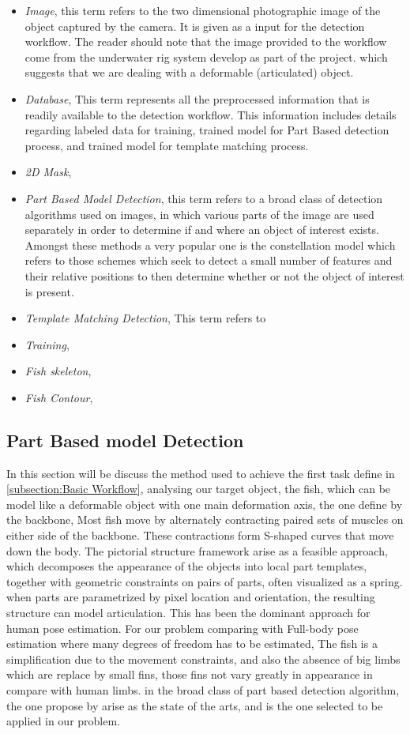 \begin{itemize}
\item \textit{Image}, this term refers to the two dimensional photographic image of the object
captured by the camera. It is given as a input for the detection workflow. The reader 
should note that the image provided to the workflow come from the underwater rig system
develop as part of the project.
which suggests that we are dealing with a deformable (articulated) object.
\item \textit{Database}, This term represents all the preprocessed information that 
is readily available to the detection workflow. This information includes details
regarding labeled data for training, trained model for Part Based detection process,
and trained model for template matching process.
\item \textit{2D Mask}, 
\item \textit{Part Based Model Detection}, this term refers to a broad class of 
detection algorithms used on images, in which various parts of the image are used 
separately in order to determine if and where an object of interest exists. 
Amongst these methods a very popular one is the constellation model which refers 
to those schemes which seek to detect a small number of features and their relative 
positions to then determine whether or not the object of interest is present. 
\item \textit{Template Matching Detection}, This term refers to 
\item \textit{Training}, 
\item \textit{Fish skeleton}, 
\item \textit{Fish Contour}, 
\end{itemize}

\subsection{Part Based model Detection}
In this section will be discuss the method used to achieve the first task define in \ref{subsection:Basic Workflow}, analysing our target object, the fish, which can be 
model like a deformable object with one main deformation axis, the one define by the backbone, Most fish move by alternately contracting paired sets of muscles on either side of the backbone. These contractions form S-shaped curves that move down the body.
The pictorial structure framework arise as a feasible approach, which decomposes the appearance
of the objects into local part templates, together with geometric constraints on pairs of parts, often visualized as a spring. when parts are parametrized by pixel location and orientation, the resulting structure can model articulation. This has been 
the dominant approach for human pose estimation. For our problem comparing with Full-body pose estimation where many degrees of freedom has to be estimated, The fish is
a simplification due to the movement constraints, and also the absence of big limbs which are replace by small fins, those fins not vary greatly in appearance in compare with human limbs.
in the broad class of part based detection algorithm, the one propose by \citet{Ramanan2012} arise as the state of the arts, and is the one selected to be applied in
our problem.
